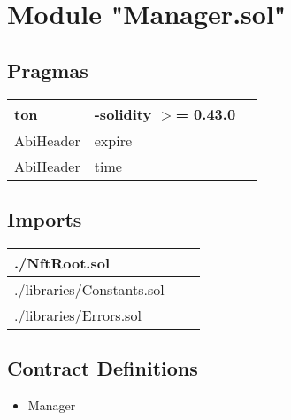 
\section{Module "Manager.sol"}


\subsection{Pragmas}


\noindent\begin{tabular}{|l|l|p{5cm}|}\hline
ton & -solidity $>$= 0.43.0 &\\\hline
AbiHeader &  expire &\\\hline
AbiHeader &  time &\\\hline
\end{tabular}


\subsection{Imports}


\noindent\begin{tabular}{|l|l|p{5cm}|}\hline
./NftRoot.sol &\\\hline
./libraries/Constants.sol &\\\hline
./libraries/Errors.sol &\\\hline
\end{tabular}


\subsection{Contract Definitions}

\begin{itemize}
\item Manager
\end{itemize}
